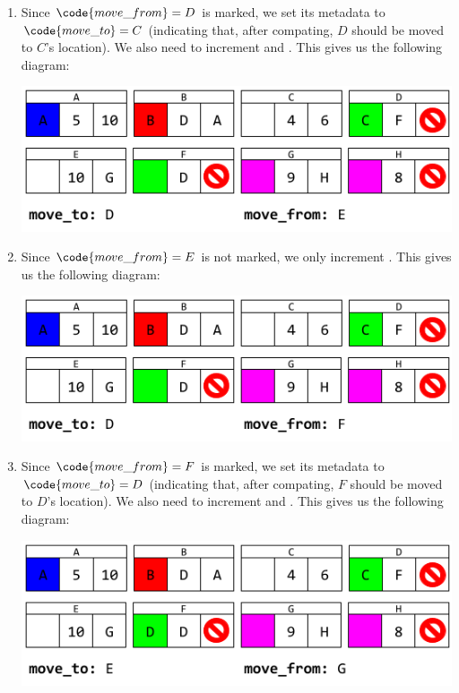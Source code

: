 \documentclass[letterpaper]{article}
\begin{document}
\begin{enumerate}
    \item Since $\code{move\_from} = D$ is marked, we set its metadata to $\code{move\_to} = C$ (indicating that, after compating, $D$ should be moved to $C$'s location). We also need to increment  and . This gives us the following diagram: 
    \begin{center}
        \includegraphics[scale=0.6]{../assets/GCAlg3_4.png}
    \end{center}

    \item Since $\code{move\_from} = E$ is not marked, we only increment . This gives us the following diagram: 
    \begin{center}
        \includegraphics[scale=0.6]{../assets/GCAlg3_5.png}
    \end{center}

    \item Since $\code{move\_from} = F$ is marked, we set its metadata to $\code{move\_to} = D$ (indicating that, after compating, $F$ should be moved to $D$'s location). We also need to increment  and . This gives us the following diagram: 
    \begin{center}
        \includegraphics[scale=0.6]{../assets/GCAlg3_6.png}
    \end{center}


\end{enumerate}
\end{document}
